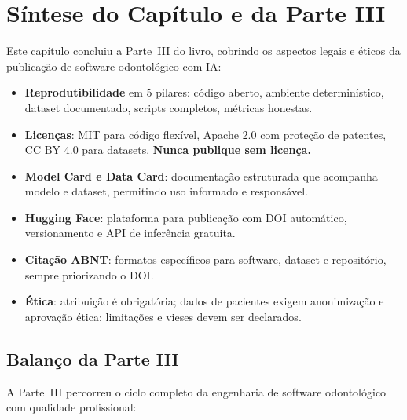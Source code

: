 \section{Síntese do Capítulo e da Parte III}

Este capítulo concluiu a Parte~III do livro, cobrindo os aspectos legais
e éticos da publicação de software odontológico com IA:

\begin{itemize}
  \item \textbf{Reprodutibilidade} em 5 pilares: código aberto, ambiente
    determinístico, dataset documentado, scripts completos, métricas
    honestas.

  \item \textbf{Licenças}: MIT para código flexível, Apache 2.0 com
    proteção de patentes, CC BY 4.0 para datasets. \textbf{Nunca publique
    sem licença.}

  \item \textbf{Model Card e Data Card}: documentação estruturada que
    acompanha modelo e dataset, permitindo uso informado e responsável.

  \item \textbf{Hugging Face}: plataforma para publicação com DOI
    automático, versionamento e API de inferência gratuita.

  \item \textbf{Citação ABNT}: formatos específicos para software,
    dataset e repositório, sempre priorizando o DOI.

  \item \textbf{Ética}: atribuição é obrigatória; dados de pacientes
    exigem anonimização e aprovação ética; limitações e vieses devem
    ser declarados.
\end{itemize}

\subsection*{Balanço da Parte III}

A Parte~III percorreu o ciclo completo da engenharia de software
odontológico com qualidade profissional:

